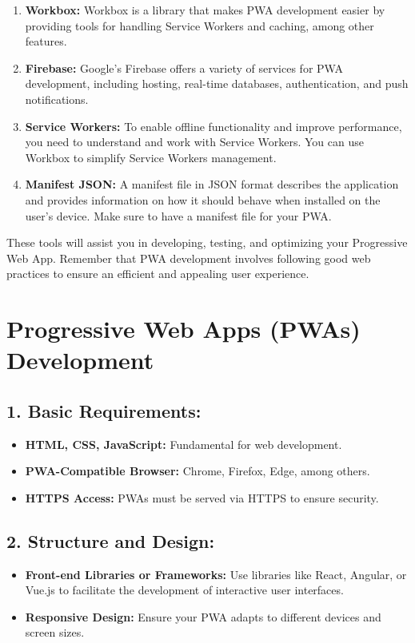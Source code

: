 \documentclass{article}
\begin{document}
\begin{enumerate}
    \item \textbf{Workbox:} Workbox is a library that makes PWA development easier by providing tools for handling Service Workers and caching, among other features.
    
    \item \textbf{Firebase:} Google's Firebase offers a variety of services for PWA development, including hosting, real-time databases, authentication, and push notifications.
    
    \item \textbf{Service Workers:} To enable offline functionality and improve performance, you need to understand and work with Service Workers. You can use Workbox to simplify Service Workers management.
    
    \item \textbf{Manifest JSON:} A manifest file in JSON format describes the application and provides information on how it should behave when installed on the user's device. Make sure to have a manifest file for your PWA.
\end{enumerate}

These tools will assist you in developing, testing, and optimizing your Progressive Web App. Remember that PWA development involves following good web practices to ensure an efficient and appealing user experience.

\section*{Progressive Web Apps (PWAs) Development}

\subsection*{1. Basic Requirements:}
\begin{itemize}
  \item \textbf{HTML, CSS, JavaScript:} Fundamental for web development.
  \item \textbf{PWA-Compatible Browser:} Chrome, Firefox, Edge, among others.
  \item \textbf{HTTPS Access:} PWAs must be served via HTTPS to ensure security.
\end{itemize}

\subsection*{2. Structure and Design:}
\begin{itemize}
  \item \textbf{Front-end Libraries or Frameworks:} Use libraries like React, Angular, or Vue.js to facilitate the development of interactive user interfaces.
  \item \textbf{Responsive Design:} Ensure your PWA adapts to different devices and screen sizes.
\end{itemize}
\end{document}
